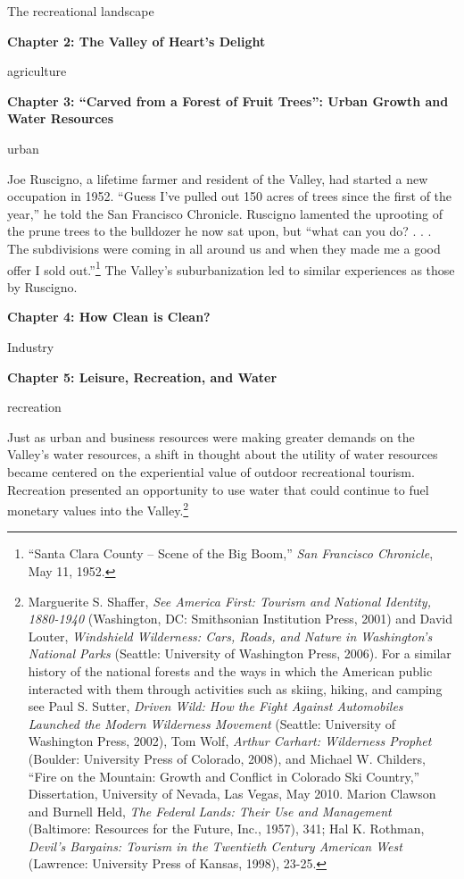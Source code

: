 \documentclass[11pt,article,oneside]{memoir}
\begin{document}
The recreational landscape

\textbf{Chapter 2: The Valley of Heart's Delight}

agriculture

\textbf{Chapter 3: ``Carved from a Forest of Fruit Trees'': Urban Growth
and Water Resources}

urban

Joe Ruscigno, a lifetime farmer and resident of the Valley, had started
a new occupation in 1952. ``Guess I've pulled out 150 acres of trees
since the first of the year,'' he told the San Francisco Chronicle.
Ruscigno lamented the uprooting of the prune trees to the bulldozer he
now sat upon, but ``what can you do? . . . The subdivisions were coming
in all around us and when they made me a good offer I sold
out.''⁠\footnote{``Santa Clara County -- Scene of the Big Boom,''
  \emph{San Francisco Chronicle}, May 11, 1952.} The Valley's
suburbanization led to similar experiences as those by Ruscigno.

\textbf{Chapter 4: How Clean is Clean?}

Industry

\textbf{Chapter 5: Leisure, Recreation, and Water}

recreation

Just as urban and business resources were making greater demands on the
Valley's water resources, a shift in thought about the utility of water
resources became centered on the experiential value of outdoor
recreational tourism. Recreation presented an opportunity to use water
that could continue to fuel monetary values into the Valley.\footnote{Marguerite
  S. Shaffer, \emph{See America First: Tourism and National Identity,
  1880-1940} (Washington, DC: Smithsonian Institution Press, 2001) and
  David Louter, \emph{Windshield Wilderness: Cars, Roads, and Nature in
  Washington's National Parks} (Seattle: University of Washington Press,
  2006). For a similar history of the national forests and the ways in
  which the American public interacted with them through activities such
  as skiing, hiking, and camping see Paul S. Sutter, \emph{Driven Wild:
  How the Fight Against Automobiles Launched the Modern Wilderness
  Movement} (Seattle: University of Washington Press, 2002), Tom Wolf,
  \emph{Arthur Carhart: Wilderness Prophet} (Boulder: University Press
  of Colorado, 2008), and Michael W. Childers, ``Fire on the Mountain:
  Growth and Conflict in Colorado Ski Country,'' Dissertation,
  University of Nevada, Las Vegas, May 2010. Marion Clawson and Burnell
  Held, \emph{The Federal Lands: Their Use and Management} (Baltimore:
  Resources for the Future, Inc., 1957), 341; Hal K. Rothman,
  \emph{Devil's Bargains: Tourism in the Twentieth Century American
  West} (Lawrence: University Press of Kansas, 1998), 23-25.}
\end{document}
